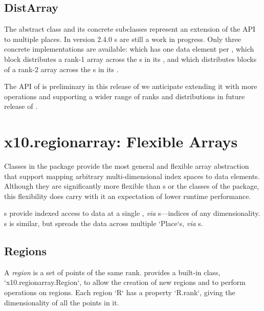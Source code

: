 \subsection{DistArray}

The abstract class  and its concrete subclasses
represent an extension of the  API to multiple places. 
In \Xten{} version 2.4.0 s are still a work in
progress.  Only three concrete implementations are available:
 which has one data element per ,
 which block distributes a rank-1 array across
the s in its , and
 which distributes blocks of a rank-2
array across the s in its .

The API of  is preliminary in this release of \Xten{}
we anticipate extending it with more operations and supporting a wider
range of ranks and distributions in future release of \Xten{}.

\section{x10.regionarray: Flexible Arrays}\label{XtenRegionArray}

Classes in the  package provide the most general and 
flexible array abstraction that support mapping arbitrary multi-dimensional
index spaces to data elements. Although they are significantly more
flexible than s or the classes of the 
package, this flexibility does carry with it an expectation of lower
runtime performance. 

s provide indexed access to data at a single , {\em via}
s---indices of any dimensionality. s is similar, but
spreads the data across multiple \xcd`Place`s, {\em via} s.  

\subsection{Regions}\label{XtenRegions}

A {\em region} is a set of points of the same rank.  {}\Xten{}
provides a built-in class, \xcd`x10.regionarray.Region`, to allow the
creation of new regions and to perform operations on regions. 
Each region \xcd`R` has a property \xcd`R.rank`, giving the dimensionality of
all the points in it.

